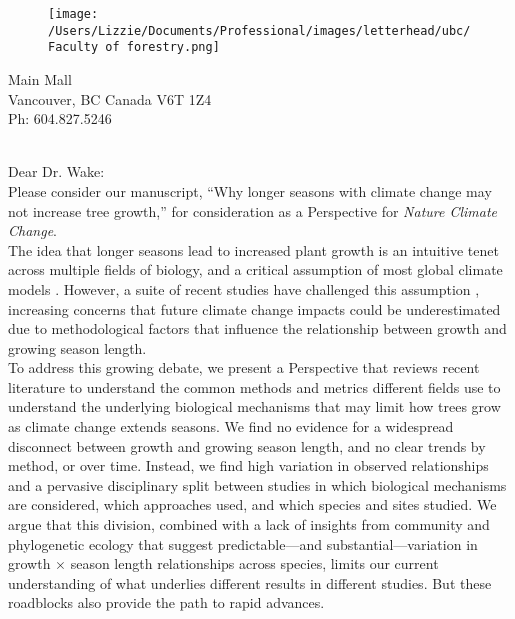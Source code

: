\documentclass[11pt,a4paper]{article}
\begin{document}

\begin{figure}[htbp]
\hspace*{14cm}                                                           
\hspace{-35ex} \texttt{[image: /Users/Lizzie/Documents/Professional/images/letterhead/ubc/Faculty of forestry.png]}
\end{figure}
\vspace{-10ex}
\begin{small}
 Main Mall \\
\noindent Vancouver, BC Canada V6T 1Z4\\
\noindent Ph: 604.827.5246\\
\end{small}
\vspace{2ex}\\
\noindent Dear Dr. Wake: %
\vspace{1.5ex}\\
Please consider our manuscript, ``Why longer seasons with climate change may not increase tree growth,'' for consideration as a Perspective for \emph{Nature Climate Change}. 
\vspace{1.5ex}\\
The idea that longer seasons lead to increased plant growth is an intuitive tenet across multiple fields of biology, and a critical assumption of most global climate models \citep{friedlingstein2022global}. However, a suite of recent studies have challenged this assumption \citep[e.g.][]{dow2022warm,green2022limits}, increasing concerns that future climate change impacts could be underestimated due to methodological factors that influence the relationship between growth and growing season length\citep{green2022limits,korner2023four}.
\vspace{1.5ex}\\
To address this growing debate, we present a Perspective that reviews recent literature to understand the common methods and metrics different fields use to understand the underlying biological mechanisms that may limit how trees grow as climate change extends seasons. We find no evidence for a widespread disconnect between growth and growing season length, and no clear trends by method, or over time. Instead, we find high variation in observed relationships and a pervasive disciplinary split between studies in which biological mechanisms are considered, which approaches used, and which species and sites studied. We argue that this division, combined with a lack of insights from community and phylogenetic ecology that suggest predictable---and substantial---variation in growth $\times$ season length relationships across species, limits our current understanding of what underlies different results in different studies. But these roadblocks also provide the path to rapid advances. 
\end{document}
